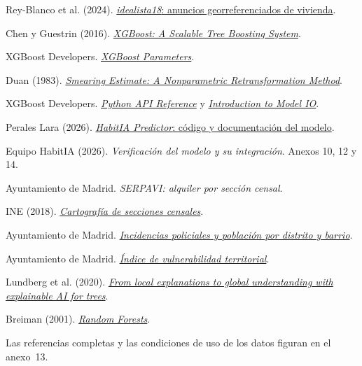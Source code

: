 \documentclass[11pt,a4paper]{article}
\newcounter{anexo}
\begin{document}
\begin{enumerate}[label={[\arabic*]},leftmargin=2.2em,itemsep=2pt,parsep=0pt,topsep=4pt]
\item Rey-Blanco et al. (2024). \href{https://github.com/paezha/idealista18}{\emph{idealista18}: anuncios georreferenciados de vivienda}.
\item Chen y Guestrin (2016). \href{https://doi.org/10.1145/2939672.2939785}{\emph{XGBoost: A Scalable Tree Boosting System}}.
\item XGBoost Developers. \href{https://xgboost.readthedocs.io/en/stable/parameter.html}{\emph{XGBoost Parameters}}.
\item Duan (1983). \href{https://doi.org/10.2307/2288126}{\emph{Smearing Estimate: A Nonparametric Retransformation Method}}.
\item XGBoost Developers. \href{https://xgboost.readthedocs.io/en/stable/python/python_api.html}{\emph{Python API Reference}} y \href{https://xgboost.readthedocs.io/en/stable/tutorials/saving_model.html}{\emph{Introduction to Model IO}}.
\item Perales Lara (2026). \href{https://github.com/tomasper17/house-pricing-model-habitia}{\emph{HabitIA Predictor}: código y documentación del modelo}.
\item Equipo HabitIA (2026). \emph{Verificación del modelo y su integración}. Anexos 10, 12 y 14.
\item Ayuntamiento de Madrid. \emph{SERPAVI: alquiler por sección censal}.
\item INE (2018). \href{https://www.ine.es}{\emph{Cartografía de secciones censales}}.
\item Ayuntamiento de Madrid. \href{https://datos.madrid.es}{\emph{Incidencias policiales y población por distrito y barrio}}.
\item Ayuntamiento de Madrid. \href{https://datos.madrid.es/dataset/300301-0-ranking-vulnerabilidad}{\emph{Índice de vulnerabilidad territorial}}.
\item Lundberg et al. (2020). \href{https://doi.org/10.1038/s42256-019-0138-9}{\emph{From local explanations to global understanding with explainable AI for trees}}.
\item Breiman (2001). \href{https://doi.org/10.1023/A:1010933404324}{\emph{Random Forests}}.
\end{enumerate}
Las referencias completas y las condiciones de uso de los datos figuran en el anexo~13.
\clearpage
{}
\setcounter{paginaanexos}{\value{page}}
\end{document}

